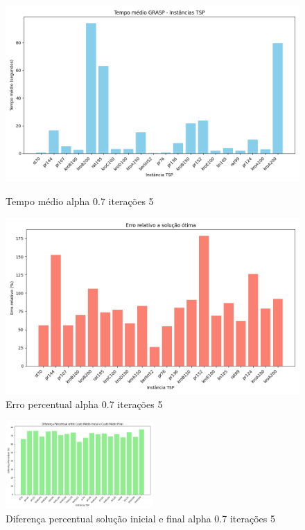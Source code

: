 \documentclass[10pt]{extarticle} %
\begin{document}
\begin{figure}[H]
    \centering
        \begin{minipage}{0.5\textwidth}
        \centering
        \includegraphics[width=1\textwidth]{./plots/average_times_saida_07_5.log.png}
        \caption{Tempo médio alpha 0.7 iterações 5}
        \label{fig:Tempo médio alpha 0.7 iterações 5}
    \end{minipage}\hfill
    \begin{minipage}{0.5\textwidth}
        \centering
        \includegraphics[width=1.0\textwidth]{./plots/solution_comparison_saida_07_5.log.png}
        \caption{Erro percentual alpha 0.7 iterações 5}
        \label{fig:Erro percentual alpha 0.7 iterações 5}
    \end{minipage}
\end{figure}

\begin{figure}[H]
    \centering
    \includegraphics[width=0.5\textwidth]{./plots/path_difference_saida_07_5.log.png}
    \caption{Diferença percentual solução inicial e final alpha 0.7 iterações 5}
    \label{fig:Diferença percentual solução inicial e final alpha 0.7 iterações 5}
\end{figure}
\end{document}
